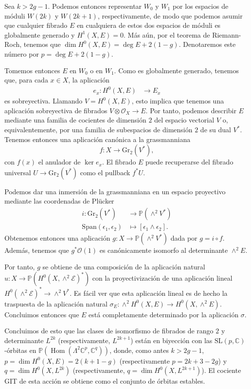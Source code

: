 \documentclass[12pt, a4paper]{amsart}
\newcommand\CC{\mathbb{C}}
\newcommand\PP{\mathbb{P}}
\newcommand\SL{\mathrm{SL}}
\newcommand\EE{\mathscr{E}}
\newcommand\OO{\mathscr{O}}
\newcommand\Gr{\mathrm{Gr}}
\DeclareMathOperator\Hom{Hom}
\theoremstyle{remark} \newtheorem{rmk}[thm]{Observación}
\theoremstyle{remark} \newtheorem{rmks}[thm]{Observaciones}
\theoremstyle{definition} \newtheorem{defn}[thm]{Definición}
\theoremstyle{definition} \newtheorem{ejs}[thm]{Ejemplos}
\theoremstyle{definition} \newtheorem{ej}[thm]{Ejemplo}
\begin{document}
Sea $k>2g-1$. Podemos entonces representar $W_0$ y $W_1$ por los espacios de móduli $W(2k)$ y $W(2k+1)$, respectivamente, de modo que podemos asumir que cualquier fibrado $E$ en cualquiera de estos dos espacios de móduli es globalmente generado y $H^1(X,E)=0$. Más aún, por el teorema de Riemann-Roch, tenemos que $\dim H^0(X,E)=\deg E+2(1-g)$. Denotaremos este número por $p= \deg E+2(1-g)$. 

Tomemos entonces $E$ en $W_0$ o en $W_1$. Como es globalmente generado, tenemos que, para cada $x\in X$, la aplicación
\begin{align*}
e_x:	H^0(X,E) & \longrightarrow E_x 
\end{align*} 
es sobreyectiva. Llamando $V=H^0(X,E)$, esto implica que tenemos una aplicación sobreyectiva de fibrados $V\otimes \OO_X \rightarrow E$. Por tanto, podemos describir $E$ mediante una familia de cocientes de dimensión $2$ del espacio vectorial $V$ o, equivalentemente, por una familia de subespacios de dimensión $2$ de su dual $V^*$. Tenemos entonces una aplicación canónica a la grassmanniana
\begin{equation*}
	f:X \longrightarrow \Gr_2(V^*),
\end{equation*} 
con $f(x)$ el anulador de $\ker e_x$. El fibrado $E$ puede recuperarse del fibrado universal $U\rightarrow \Gr_2(V^*)$ como el pullback $f^*U$.

Podemos dar una inmersión de la grassmanniana en un espacio proyectivo mediante las coordenadas de Plücker
\begin{align*}
	i: \Gr_2(V^*) & \longrightarrow \PP(\wedge^2 V^*) \\
	\mathrm{Span}(\epsilon_1,\epsilon_2) & \longmapsto [\epsilon_1\wedge \epsilon_2].
\end{align*} 
Obtenemos entonces una aplicación $g:X\rightarrow \PP(\wedge^2 V^*)$ dada por $g=i\circ f$. Además, tenemos que $g^* \OO(1)$ es canónicamente isomorfo al determinante $\wedge^2 E$.

Por tanto, $g$ se obtiene de una composición de la aplicación natural $u:X\rightarrow \PP(H^0(X,\wedge^2 \EE)^*)$ con la proyectivización de una aplicación lineal $H^0(\wedge^2 \EE)^*\rightarrow \wedge^2 V^*$. Es fácil ver que esta aplicación lineal es de hecho la traspuesta de la aplicación natural $\sigma_E:\wedge^2 H^0(X,E)\rightarrow H^0(X,\wedge^2 E)$.
Concluimos entonces que $E$ está completamente determinado por la aplicación $\sigma$.

Concluimos de esto que las clases de isomorfismo de fibrados de rango $2$ y determinante $L^{2k}$  (respectivamente, $L^{2k+1}$) están en biyección con las $\SL(p,\CC)$-órbitas en $\PP(\Hom(\Lambda^2 \CC^p,\CC^q))$, donde, como antes $k>2g-1$, $p=\dim H^0(X,E)=2(k+1-g)$ (respectivamente $p=2k+3-2g$) y $q=\dim H^0(X,L^{2k})$ (respectivamente, $q=\dim H^0(X,L^{2k+1})$). El cociente GIT de esta acción se obtiene como el conjunto de órbitas estables. 
\end{document}
